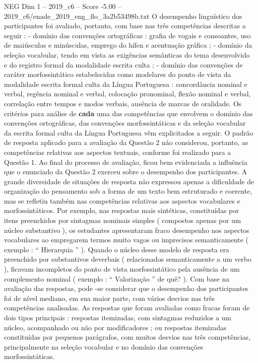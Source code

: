 \begin{textsample}{NEG Dim 1 – 2019\_c6 – Score -5.00 – 2019\_c6/enade\_2019\_eng\_flo\_3a2b53498b.txt}
O desempenho linguístico dos participantes foi avaliado, portanto, com base nas três competências descritas a seguir : - domínio das convenções ortográficas : grafia de vogais e consoantes, uso de maiúsculas e minúsculas, emprego do hífen e acentuação gráfica ; - domínio da seleção vocabular, tendo em vista as exigências semânticas do tema desenvolvido e do registro formal da modalidade escrita culta ; - domínio das convenções de caráter morfossintático estabelecidas como modelares do ponto de vista da modalidade escrita formal culta da Língua Portuguesa : concordância nominal e verbal, regência nominal e verbal, colocação pronominal, flexão nominal e verbal, correlação entre tempos e modos verbais, ausência de marcas de oralidade.
Os critérios para análise de \textbf{cada} uma das competências que envolvem o domínio das convenções ortográficas, das convenções morfossintáticas e da seleção vocabular da escrita formal culta da Língua Portuguesa vêm explicitados a seguir.
O padrão de resposta aplicado para a avaliação da Questão 2 não considerou, portanto, as competências relativas aos aspectos textuais, conforme foi realizado para a Questão 1.
Ao final do processo de avaliação, ficou bem evidenciada a influência que o enunciado da Questão 2 exerceu sobre o desempenho dos participantes.
A grande diversidade de situações de resposta não expressou apenas a dificuldade de organização do pensamento sob a forma de um texto bem estruturado e coerente, mas se refletiu também nas competências relativas aos aspectos vocabulares e morfossintáticos.
Por exemplo, nas respostas mais sintéticas, constituídas por itens preenchidos por sintagmas nominais simples ( compostos apenas por um núcleo substantivo ), os estudantes apresentaram fraco desempenho nos aspectos vocabulares ao empregarem termos muito vagos ou imprecisos semanticamente ( exemplo : “ Hierarquia ” ).
Quando o núcleo desse modelo de resposta era preenchido por substantivos deverbais ( relacionados semanticamente a um verbo ), ficavam incompletos do ponto de vista morfossintático pela ausência de um complemento nominal ( exemplo : “ Valorização ” de quê? ).
Com base na avaliação das respostas, pode -se considerar que o desempenho dos participantes foi de nível mediano, em sua maior parte, com vários desvios nas três competências analisadas.
As respostas que foram avaliadas como fracas foram de dois tipos principais : respostas itemizadas, com sintagmas reduzidos a um núcleo, acompanhado ou não por modificadores ; ou respostas itemizadas constituídas por pequenos parágrafos, com muitos desvios nas três competências, principalmente na seleção vocabular e no domínio das convenções morfossintáticas.

\end{textsample}
